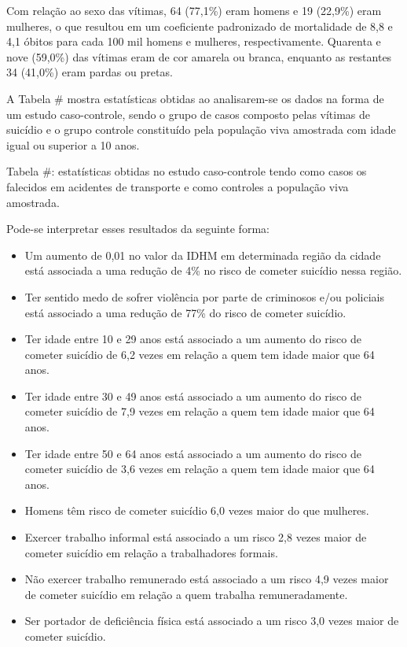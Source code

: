 Com relação ao sexo das vítimas, 64 (77,1\%) eram homens e 19 (22,9\%) eram mulheres, o que resultou em um coeficiente padronizado de mortalidade de 8,8 e 4,1 óbitos para cada 100 mil homens e mulheres, respectivamente. Quarenta
e nove (59,0\%) das vítimas eram de cor amarela ou branca, enquanto as restantes 34 (41,0\%) eram pardas ou pretas.

A Tabela \# mostra estatísticas obtidas ao analisarem-se os dados na forma de um estudo caso-controle, sendo o grupo de casos composto pelas vítimas de suicídio e o grupo controle constituído pela população viva amostrada com idade igual ou superior a 10 anos.

Tabela \#: estatísticas obtidas no estudo caso-controle tendo como casos os falecidos em acidentes de transporte e como controles a população viva amostrada.

Pode-se interpretar esses resultados da seguinte forma:

\begin{itemize}
    \item Um aumento de 0,01 no valor da IDHM em determinada região da cidade está associada a uma redução de 4\% no risco de cometer suicídio nessa região.
    \item Ter sentido medo de sofrer violência por parte de criminosos e/ou policiais está associado a uma redução de 77\% do risco de cometer suicídio.
    \item Ter idade entre 10 e 29 anos está associado a um aumento do risco de cometer suicídio de 6,2 vezes em relação a quem tem idade maior que 64 anos.
    \item Ter idade entre 30 e 49 anos está associado a um aumento do risco de cometer suicídio de 7,9 vezes em relação a quem tem idade maior que 64 anos.
    \item Ter idade entre 50 e 64 anos está associado a um aumento do risco de cometer suicídio de 3,6 vezes em relação a quem tem idade maior que 64 anos.
    \item Homens têm risco de cometer suicídio 6,0 vezes maior do que mulheres.
    \item Exercer trabalho informal está associado a um risco 2,8 vezes maior de cometer suicídio em relação a trabalhadores formais.
    \item Não exercer trabalho remunerado está associado a um risco 4,9 vezes maior de cometer suicídio em relação a quem trabalha remuneradamente.
    \item Ser portador de deficiência física está associado a um risco 3,0 vezes maior de cometer suicídio.
\end{itemize}

